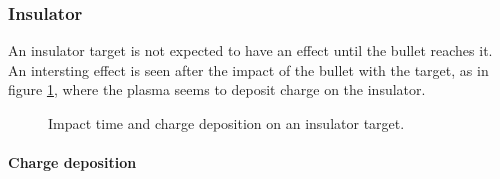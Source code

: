 \subsubsection{Insulator}
An insulator target is not expected to have an effect until the bullet reaches it. An intersting effect is seen after the impact of the bullet with the target, as in figure \ref{fig:elio_ins}, where the plasma seems to deposit charge on the insulator.
\begin{figure}
 \centering
 \hfill
 \hfill
 \caption{Impact time and charge deposition on an insulator target.}
 \label{fig:elio_ins}
\end{figure}


\paragraph{Charge deposition}

